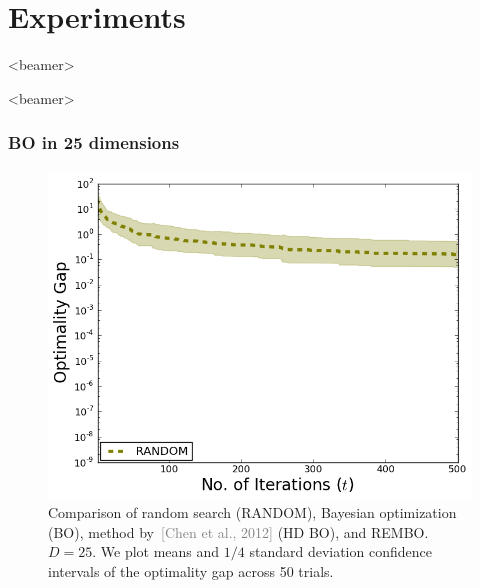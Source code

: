 \documentclass[grey]{beamer}
\begin{document}
 \section{Experiments}
 \begin{frame}<beamer>
  \tableofcontents[currentsection]
 \end{frame}
 

 
 \begin{frame}<beamer>
  \frametitle{BO in 25 dimensions}
  
  \begin{figure}
   \includegraphics[width=0.6\columnwidth]{./figs/branin_dis1.png}
    \caption{Comparison of random search (RANDOM), Bayesian optimization (BO),
     method by~\textcolor{gray}{[Chen et al., 2012]} (HD BO), and REMBO.
     $D=25$. We plot means and $1/4$ 
     standard deviation confidence intervals of the optimality gap across 50 trials.}
   \label{fig:standard}
  \end{figure}
 \end{frame}
 
\end{document}
